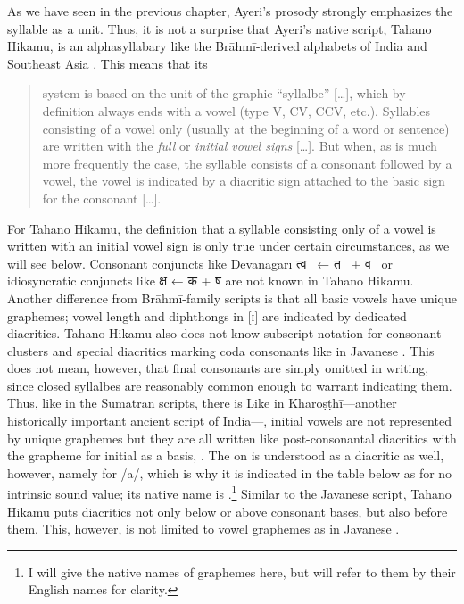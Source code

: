 As we have seen in the previous chapter, Ayeri's prosody strongly emphasizes 
the syllable as a unit. Thus, it is not a surprise that Ayeri's native script,
Tahano Hikamu, is an alphasyllabary like the Brāhmī-derived alphabets of India 
and Southeast Asia \parencites{salomon1996}{court1996}. 
This means that its 

\blockcquote[376]{salomon1996}{system is based on the unit of the graphic 
\enquote{syllalbe} […], which by definition always ends with a vowel (type V, 
CV, CCV, etc.). Syllables consisting of a vowel only (usually at the beginning 
of a word or sentence) are written with the \emph{full} or \emph{initial vowel 
signs} […]. But when, as is much more frequently the case, the syllable consists 
of a consonant followed by a vowel, the vowel is indicated by a diacritic sign 
attached to the basic sign for the consonant […].}

For Tahano Hikamu, the definition that a syllable consisting only of a vowel is 
written with an initial vowel sign is only true under certain circumstances, as 
we will see below. Consonant conjuncts like Devanāgarī {\FS त्व}~ ← 
{\FS त}~ + {\FS व}~ or idiosyncratic conjuncts like {\FS क्ष} 
 ← {\FS क}  + {\FS ष}  are not known in Tahano 
Hikamu. Another difference from Brāhmī-family scripts is that all basic vowels 
have unique graphemes; vowel length and diphthongs in [ɪ] are indicated by 
dedicated diacritics. Tahano Hikamu also does not know subscript notation for 
consonant clusters and special diacritics marking coda consonants like in 
Javanese \citep[478--479]{kuipersmcdermott1996}. This does not mean, however, 
that final consonants are simply omitted in writing, since closed syllalbes are 
reasonably common enough to warrant indicating them. Thus, like in the Sumatran 
scripts, there is  Like in Kharoṣṭhī---another historically important ancient script 
of India---, initial vowels are not represented by unique graphemes but they 
are all written like post-consonantal diacritics with the grapheme for initial 
 as a basis,  \citep[377]{salomon1996}. The  on 
 is understood as a diacritic as well, however, namely for /a/, which is 
why it is indicated in the table below as   for no intrinsic 
sound value; its native name is .\footnote{I will 
give the native names of graphemes here, but will refer to them by their 
English names for clarity.} Similar to the Javanese script, Tahano Hikamu puts 
diacritics not only below or above consonant bases, but also before them. This, 
however, is not limited to vowel graphemes as in Javanese 
\citep[478]{kuipersmcdermott1996}.

